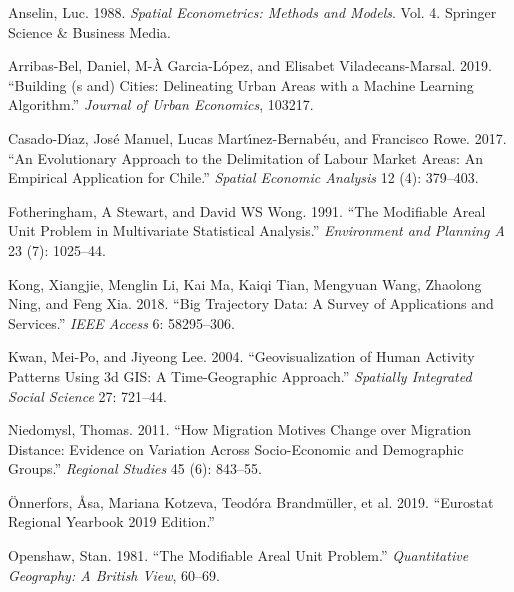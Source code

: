 \documentclass[
  letterpaper,
  DIV=11,
  numbers=noendperiod]{scrreprt}
\newlength{\cslhangindent}
\newlength{\cslentryspacingunit} %
\newenvironment{CSLReferences}[2] %
 {%
  \setlength{\parindent}{0pt}
  \ifodd #1
  \let\oldpar\par
  \def\par{\hangindent=\cslhangindent\oldpar}
  \fi
  \setlength{\parskip}{#2\cslentryspacingunit}
 }%
 {}
\begin{document}
\hypertarget{refs}{}
\begin{CSLReferences}{1}{0}
\leavevmode{}%
Anselin, Luc. 1988. \emph{Spatial Econometrics: Methods and Models}.
Vol. 4. Springer Science \& Business Media.

\leavevmode{}%
Arribas-Bel, Daniel, M-À Garcia-López, and Elisabet Viladecans-Marsal.
2019. {``Building (s and) Cities: Delineating Urban Areas with a Machine
Learning Algorithm.''} \emph{Journal of Urban Economics}, 103217.

\leavevmode{}%
Casado-Dı́az, José Manuel, Lucas Martı́nez-Bernabéu, and Francisco Rowe.
2017. {``An Evolutionary Approach to the Delimitation of Labour Market
Areas: An Empirical Application for Chile.''} \emph{Spatial Economic
Analysis} 12 (4): 379--403.

\leavevmode{}%
Fotheringham, A Stewart, and David WS Wong. 1991. {``The Modifiable
Areal Unit Problem in Multivariate Statistical Analysis.''}
\emph{Environment and Planning A} 23 (7): 1025--44.

\leavevmode{}%
Kong, Xiangjie, Menglin Li, Kai Ma, Kaiqi Tian, Mengyuan Wang, Zhaolong
Ning, and Feng Xia. 2018. {``Big Trajectory Data: A Survey of
Applications and Services.''} \emph{IEEE Access} 6: 58295--306.

\leavevmode{}%
Kwan, Mei-Po, and Jiyeong Lee. 2004. {``Geovisualization of Human
Activity Patterns Using 3d GIS: A Time-Geographic Approach.''}
\emph{Spatially Integrated Social Science} 27: 721--44.

\leavevmode{}%
Niedomysl, Thomas. 2011. {``How Migration Motives Change over Migration
Distance: Evidence on Variation Across Socio-Economic and Demographic
Groups.''} \emph{Regional Studies} 45 (6): 843--55.

\leavevmode{}%
Önnerfors, Åsa, Mariana Kotzeva, Teodóra Brandmüller, et al. 2019.
{``Eurostat Regional Yearbook 2019 Edition.''}

\leavevmode{}%
Openshaw, Stan. 1981. {``The Modifiable Areal Unit Problem.''}
\emph{Quantitative Geography: A British View}, 60--69.


\end{CSLReferences}
\end{document}
